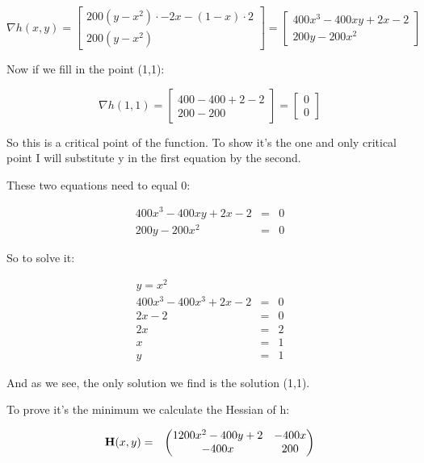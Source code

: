 \documentclass[a4paper]{article}
\begin{document}
\begin{equation}
\nabla h(x,y) = \begin{bmatrix}
200(y-x^2)\cdot -2x -(1-x)\cdot 2\\
200(y-x^2)
\end{bmatrix} = \begin{bmatrix}
400x^3-400xy+2x-2\\
200y-200x^2
\end{bmatrix}
\end{equation}

Now if we fill in the point (1,1):

\begin{equation}
\nabla h(1,1) = \begin{bmatrix}
400-400+2-2\\
200-200
\end{bmatrix} = \begin{bmatrix}
0\\
0
\end{bmatrix}
\end{equation}

So this is a critical point of the function. To show it's the one and only critical point I will substitute y in the first equation by the second.

These two equations need to equal 0:

\begin{eqnarray}
400x^3-400xy+2x-2 &=& 0\\
200y-200x^2 &=& 0
\end{eqnarray}

So to solve it:

\begin{eqnarray}
y = x^2\\
400x^3 -400x^3 + 2x - 2 &=& 0\\
2x-2 &=& 0\\
2x &=& 2\\
x &=& 1\\
y &=& 1
\end{eqnarray}

And as we see, the only solution we find is the solution (1,1).

To prove it's the minimum we calculate the Hessian of h:

\begin{eqnarray}
\bold H(x,y) &=& \begin{pmatrix}
1200x^2 - 400y + 2 & -400x\\
-400x & 200
\end{pmatrix}
\end{eqnarray}
\end{document}
